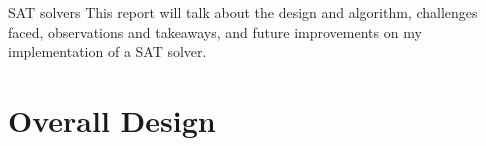 \documentclass[11pt]{article}
\begin{document}
SAT solvers 
This report will talk about the design and algorithm, challenges faced, observations and takeaways, and future improvements on my implementation of a SAT solver. 


\section{Overall Design}

\newpage



\end{document}
